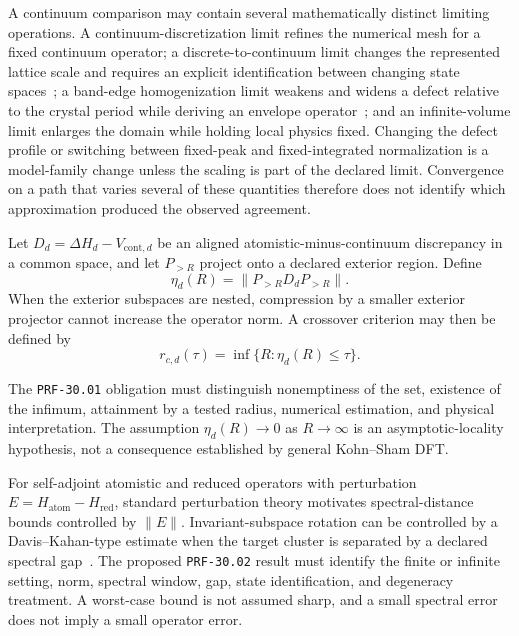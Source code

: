 A continuum comparison may contain several mathematically distinct limiting
operations. A continuum-discretization limit refines the numerical mesh for a
fixed continuum operator; a discrete-to-continuum limit changes the represented
lattice scale and requires an explicit identification between changing state
spaces~\cite{nakamuraTadano2021}; a band-edge homogenization limit weakens and
widens a defect relative to the crystal period while deriving an envelope
operator~\cite{hoeferWeinstein2011,ducheneVukicevicWeinstein2015}; and an
infinite-volume limit enlarges the domain while holding local physics fixed.
Changing the defect profile or switching between fixed-peak and
fixed-integrated normalization is a model-family change unless the scaling is
part of the declared limit. Convergence on a path that varies several of these
quantities therefore does not identify which approximation produced the
observed agreement.

Let $D_d=\Delta H_d-V_{\mathrm{cont},d}$ be an aligned atomistic-minus-continuum
discrepancy in a common space, and let $P_{>R}$ project onto a declared exterior
region. Define
\begin{equation}
  \eta_d(R)
  =
  \|P_{>R}D_dP_{>R}\|.
\end{equation}
When the exterior subspaces are nested, compression by a smaller exterior
projector cannot increase the operator norm. A crossover criterion may then be
defined by
\begin{equation}
  r_{c,d}(\tau)
  =
  \inf\{R:\eta_d(R)\leq\tau\}.
\end{equation}

The \texttt{PRF-30.01} obligation must distinguish nonemptiness of the set,
existence of the infimum, attainment by a tested radius, numerical estimation,
and physical interpretation. The assumption
$\eta_d(R)\to0$ as $R\to\infty$ is an asymptotic-locality hypothesis, not a
consequence established by general Kohn--Sham DFT.


For self-adjoint atomistic and reduced operators with perturbation
$E=H_{\mathrm{atom}}-H_{\mathrm{red}}$, standard perturbation theory motivates
spectral-distance bounds controlled by $\|E\|$. Invariant-subspace rotation can
be controlled by a Davis--Kahan-type estimate when the target cluster is
separated by a declared spectral gap~\cite{davis1970}. The proposed
\texttt{PRF-30.02} result must identify the finite or infinite setting, norm,
spectral window, gap, state identification, and degeneracy treatment. A
worst-case bound is not assumed sharp, and a small spectral error does not imply
a small operator error.

